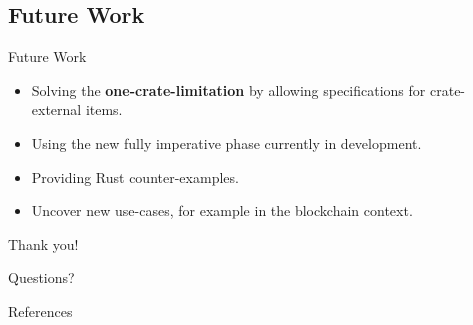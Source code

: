 \subsection{Future Work}

\begin{frame}{Future Work}
\begin{itemize}
  \item Solving the \textbf{one-crate-limitation} by allowing specifications
  for crate-external items.

  \item Using the new fully imperative phase currently in development.

  \item Providing Rust counter-examples.

  \item Uncover new use-cases, for example in the blockchain context.
\end{itemize}
\end{frame}

\begin{frame}[standout]
Thank you!
\end{frame}

\begin{frame}[standout]
Questions?
\end{frame}


\begin{frame}[allowframebreaks]{References}
  
  
\end{frame}


\appendix
